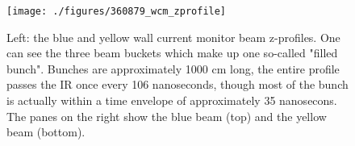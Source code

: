 \begin{figure}
\begin{center}
\texttt{[image: ./figures/360879\_wcm\_zprofile]}
\caption{ 
Left: the blue and yellow wall current monitor beam z-profiles. One can see the
three beam buckets which make up one so-called "filled bunch". Bunches are
approximately 1000 cm long, the entire profile passes the IR once every 106
nanoseconds, though most of the bunch is actually within a time envelope of
approximately 35 nanosecons. The panes on the right show the blue beam (top)
and the yellow beam (bottom).
}
\label{fig:360879_wcm_zprofile}
\end{center}
\end{figure}
